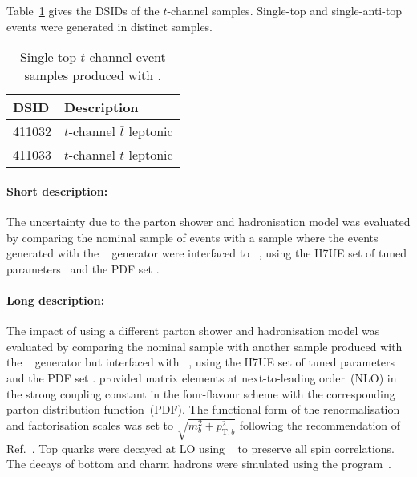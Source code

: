 Table~\ref{tab:tchan_PH7} gives the DSIDs of the $t$-channel \POWHER[7] samples.
Single-top and single-anti-top events were generated in distinct samples.
\begin{table}[htbp]
\begin{center}
\caption{Single-top $t$-channel event samples produced with \POWHER[7].} 
\label{tab:tchan_PH7}
\begin{tabular}{ l | l }
\hline
DSID & Description \\
\hline
411032 & $t$-channel $\bar t$ leptonic \\
411033 & $t$-channel $t$ leptonic \\
\hline
\end{tabular}
\end{center}
\end{table}

\paragraph{Short description:}

The uncertainty due to the parton shower and hadronisation model was
evaluated by comparing the nominal sample of events with a sample where
the events generated with the
\POWHEGBOX[v2]~\cite{Frederix:2012dh,Nason:2004rx,Frixione:2007vw,Alioli:2010xd}
generator were interfaced to
\HERWIG[7.04]~\cite{Bahr:2008pv,Bellm:2015jjp}, using the H7UE set
of tuned parameters~\cite{Bellm:2015jjp} and the \MMHT[lo] PDF set
\cite{Harland-Lang:2014zoa}.

\paragraph{Long description:}

The impact of using a different parton shower and hadronisation model was evaluated by comparing the nominal sample
with another sample produced with the \POWHEGBOX[v2]~\cite{Frederix:2012dh,Nason:2004rx,Frixione:2007vw,Alioli:2010xd}
generator but interfaced with \HERWIG[7.04]~\cite{Bahr:2008pv,Bellm:2015jjp}, using the H7UE set of
tuned parameters~\cite{Bellm:2015jjp} and the \MMHT[lo] PDF set \cite{Harland-Lang:2014zoa}.
\POWHEGBOX provided matrix elements at next-to-leading order~(NLO) in the strong coupling constant \alphas
in the four-flavour scheme with the corresponding \NNPDF[3.0nlo]~\cite{Ball:2014uwa} parton distribution function~(PDF).
The functional form of the renormalisation and factorisation scales was set to $\sqrt{m_b^2 + p_{\text{T},b}^2}$
following the recommendation of Ref.~\cite{Frederix:2012dh}.
Top quarks were decayed at LO using \MADSPIN~\cite{Frixione:2007zp,Artoisenet:2012st} to preserve all spin correlations.
The decays of bottom and charm hadrons were simulated using the \EVTGEN[1.6.0] program~\cite{Lange:2001uf}.

